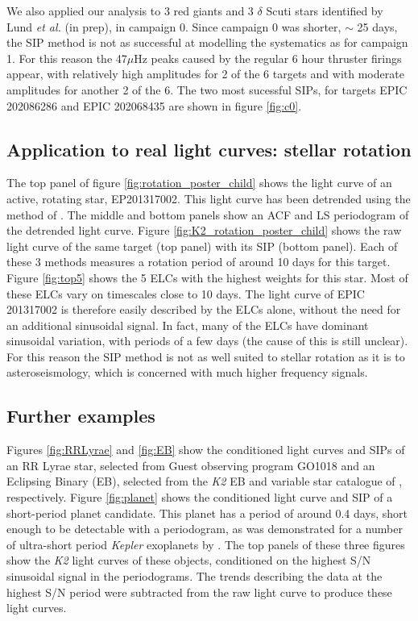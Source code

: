 \documentclass[useAMS, usenatbib, preprint, 12pt]{aastex}
\begin{document}
We also applied our analysis to 3 red giants and 3 $\delta$ Scuti stars
identified by Lund {\it et al.} (in prep), in campaign 0.
Since campaign 0 was shorter, $\sim$ 25 days, the SIP method is not as
successful at modelling the systematics as for campaign 1.
For this reason the 47$\mu$Hz peaks caused by the regular 6 hour thruster
firings appear, with relatively high amplitudes for 2 of the 6 targets and with
moderate amplitudes for another 2 of the 6.
The two most sucessful SIPs, for targets EPIC 202086286 and EPIC
202068435 are shown in figure \ref{fig:c0}.

\subsection{Application to real light curves: stellar rotation}
The top panel of figure \ref{fig:rotation_poster_child} shows the light curve
of an active, rotating star, EP201317002.
This light curve has been detrended using the method of
\citet{Vanderburg2014}.
The middle and bottom panels show an ACF and LS periodogram of the
detrended light curve.
Figure \ref{fig:K2_rotation_poster_child} shows the raw light curve of the
same target (top panel) with its SIP (bottom panel).
Each of these 3 methods measures a rotation period of around 10 days for this
target.
Figure \ref{fig:top5} shows the 5 ELCs with the highest weights for this star.
Most of these ELCs vary on timescales close to 10 days.
The light curve of EPIC 201317002 is therefore easily described by the ELCs
alone, without the need for an additional sinusoidal signal.
In fact, many of the ELCs have dominant sinusoidal variation, with periods
of a few days (the cause of this is still unclear).
For this reason the SIP method is not as well suited to stellar rotation as it
is to asteroseismology, which is concerned with much higher frequency signals.

\subsection{Further examples}
Figures \ref{fig:RRLyrae} and \ref{fig:EB} show the conditioned light curves
and SIPs of an RR Lyrae star, selected from Guest observing program GO1018 and
an Eclipsing Binary (EB), selected from the {\it K2} EB and variable star
catalogue of \citet{Armstrong2015}, respectively.
Figure \ref{fig:planet} shows the conditioned light curve and SIP of a
short-period planet candidate.
This planet has a period of around 0.4 days, short enough to be detectable
with a periodogram, as was demonstrated for a number of ultra-short
period {\it Kepler} exoplanets by \citet{Sanchis-Ojeda2014}.
The top panels of these three figures show the {\it K2} light curves of these
objects, conditioned on the highest S/N sinusoidal signal in the
periodograms.
The trends describing the data at the highest S/N period were subtracted from
the raw light curve to produce these light curves.
\end{document}
